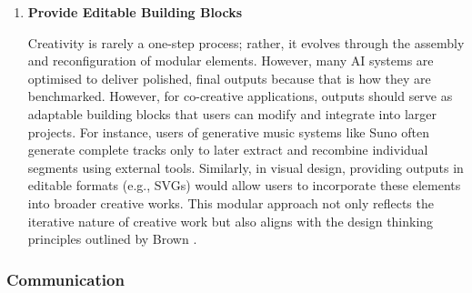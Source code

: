 \begin{enumerate}
\item \textbf{Provide Editable Building Blocks}

Creativity is rarely a one-step process; rather, it evolves through the assembly and reconfiguration of modular elements. However, many AI systems are optimised to deliver polished, final outputs because that is how they are benchmarked. However, for co-creative applications, outputs should serve as adaptable building blocks that users can modify and integrate into larger projects. For instance, users of generative music systems like Suno often generate complete tracks only to later extract and recombine individual segments using external tools. Similarly, in visual design, providing outputs in editable formats (e.g., SVGs) would allow users to incorporate these elements into broader creative works. This modular approach not only reflects the iterative nature of creative work \cite{Finke1992-kh} but also aligns with the design thinking principles outlined by Brown \cite{Brown2009-tz}.

\end{enumerate}


\subsubsection{Communication}

